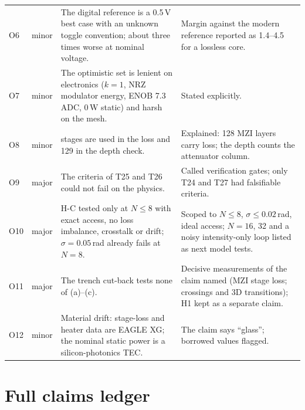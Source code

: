 \documentclass[11pt,a4paper]{article}
\begin{document}
\begin{longtable}{@{}l>{\raggedright\arraybackslash}p{1.15cm}>{\raggedright\arraybackslash}p{6.4cm}>{\raggedright\arraybackslash}p{6.6cm}@{}}
O6 & minor & The digital reference is a 0.5\,V best case with an unknown toggle convention; about three times worse at nominal voltage. & Margin against the modern reference reported as 1.4--4.5 for a lossless core. \\
O7 & minor & The optimistic set is lenient on electronics ($k=1$, NRZ modulator energy, ENOB 7.3 ADC, 0\,W static) and harsh on the mesh. & Stated explicitly. \\
O8 & minor & 128 stages are used in the loss and 129 in the depth check. & Explained: 128 MZI layers carry loss; the depth counts the attenuator column. \\
O9 & major & The criteria of T25 and T26 could not fail on the physics. & Called verification gates; only T24 and T27 had falsifiable criteria. \\
O10 & major & H-C tested only at $N\le8$ with exact access, no loss imbalance, crosstalk or drift; $\sigma=0.05$\,rad already fails at $N=8$. & Scoped to $N\le8$, $\sigma\le0.02$\,rad, ideal access; $N=16$, 32 and a noisy intensity-only loop listed as next model tests. \\
O11 & major & The trench cut-back tests none of (a)--(c). & Decisive measurements of the claim named (MZI stage loss; crossings and 3D transitions); H1 kept as a separate claim. \\
O12 & minor & Material drift: stage-loss and heater data are EAGLE XG; the nominal static power is a silicon-photonics TEC. & The claim says ``glass''; borrowed values flagged. \\
\end{longtable}
\endgroup

\clearpage
\section{Full claims ledger}
\label{app:claims}

\begingroup\scriptsize

\endgroup
\end{document}

